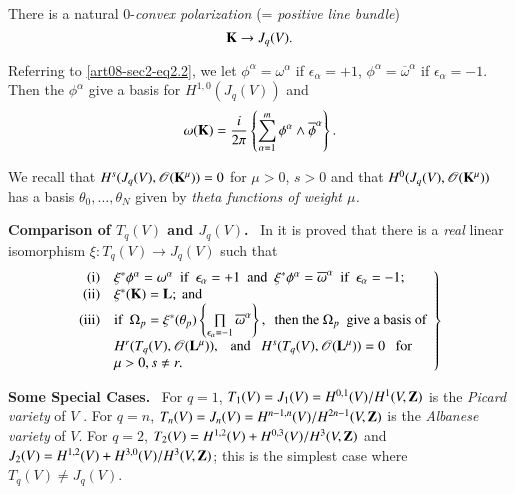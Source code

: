 There is a natural $0$-{\em convex polarization} (= {\em positive line bundle})
\begin{equation}
\mathbf{K}\to J_{q}(V).\label{art08-sec2-eq2.4}
\end{equation}

Referring to \eqref{art08-sec2-eq2.2}, we let $\phi^{\alpha}=\omega^{\alpha}$ if $\epsilon_{\alpha}=+1$, $\phi^{\alpha}=\overline{\omega}^{\alpha}$ if $\epsilon_{\alpha}=-1$. Then the $\phi^{\alpha}$ give a basis for $H^{1,0}(J_{q}(V))$ and
\begin{equation}
\omega (\mathbf{K})=\dfrac{i}{2\pi}\left\{\sum\limits^{m}_{\alpha=1}\phi^{\alpha}\wedge \overline{\phi}^{\alpha}\right\}.\label{art08-sec2-eq2.5}
\end{equation}

We recall \cite{art08-key23} that $H^{s}(J_{q}(V),\mathscr{O}(\mathbf{K}^{\mu}))=0$ for $\mu>0$, $s>0$ and that $H^{0}(J_{q}(V),\mathscr{O}(\mathbf{K}^{\mu}))$ has a basis $\theta_{0},\ldots,\theta_{N}$ given by {\em theta functions of weight $\mu$.}

\medskip
\noindent
{\bf Comparison of \boldmath$T_{q}(V)$ and $J_{q}(V)$.}~ In \cite{art08-key9} it is proved that there is a {\em real} linear isomorphism $\xi:T_{q}(V)\to J_{q}(V)$ such that
\begin{equation}
\left.
\begin{array}[l]{@{}rl}
{\rm(i)} & \xi^{*}\phi^{\alpha}=\omega^{\alpha}\text{~ if~ } \epsilon_{\alpha}=+1\text{~ and~ } \xi^{*}\phi^{\alpha}=\overline{\omega}^{\alpha}\text{~ if~ } \epsilon_{\alpha}=-1;\\
{\rm(ii)} & \xi^{*}(\bfK)=\bfL;~ \text{and}\\
{\rm(iii)} & \text{if~~} \Omega_{p}=\xi^{*}(\theta_{p})\left\{\prod\limits_{\epsilon_{\alpha}=-1}\overline{\omega}^{\alpha}\right\}, \text{~ then the } \Omega_{p}\text{~ give a basis of}\\
 & H^{r}(T_{q}(V),\mathscr{O}(\bfL^{\mu})),\text{~~ and~~ }H^{s}(T_{q}(V),\mathscr{O}(\bfL^{\mu}))=0\text{~~ for}\\
& \mu>0, s\neq r.
\end{array}
\right\}\label{art08-sec2-eq2.6}
\end{equation}

\noindent
{\bf Some Special Cases.}~ For $q=1$, $T_{1}(V)=J_{1}(V)=H^{0,1}(V)/H^{1}(V,\mathbf{Z})$ is the {\em Picard variety} of $V$ \cite{art08-key22}. For $q=n$, $T_{n}(V)=J_{n}(V)=H^{n-1,n}(V)\break /H^{2n-1}(V,\bfZ)$ is the {\em Albanese variety} \cite{art08-key3} of $V$. For $q=2$, $T_{2}(V)=H^{1,2}(V)+H^{0,3}(V)/H^{3}(V,\mathbf{Z})$ and $J_{2}(V)=H^{1,2}(V)+H^{3,0}(V)/H^{3}(V,\mathbf{Z})$; this is the simplest case where $T_{q}(V)\neq J_{q}(V)$.

